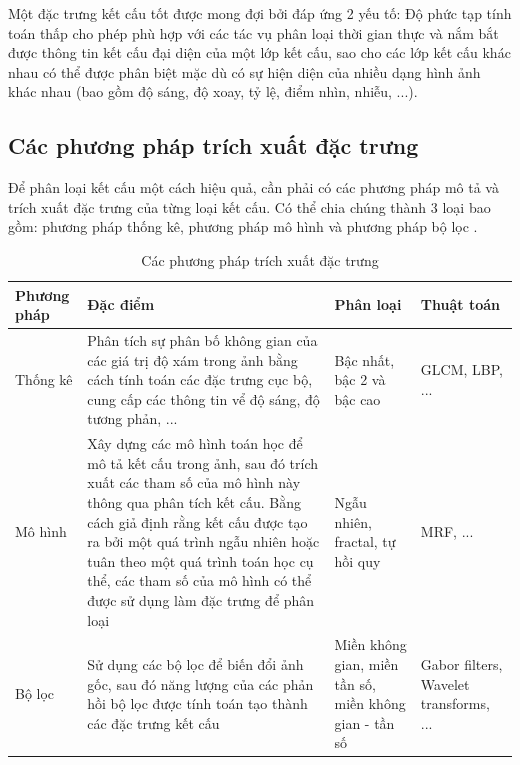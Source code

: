 Một đặc trưng kết cấu tốt được mong đợi bởi đáp ứng 2 yếu tố: Độ phức tạp tính toán thấp cho phép phù hợp với các tác vụ phân loại thời gian thực và nắm bắt được thông tin kết cấu đại diện của một lớp kết cấu, sao cho các lớp kết cấu khác nhau có thể được phân biệt mặc dù có sự hiện diện của nhiều dạng hình ảnh khác nhau (bao gồm độ sáng, độ xoay, tỷ lệ, điểm nhìn, nhiễu, ...).


\subsection{Các phương pháp trích xuất đặc trưng}
Để phân loại kết cấu một cách hiệu quả, cần phải có các phương pháp mô tả và trích xuất đặc trưng của từng loại kết cấu. Có thể chia chúng thành 3 loại bao gồm: phương pháp thống kê, phương pháp mô hình và phương pháp bộ lọc \cite{analyticOfTexture}.

\begin{table}[h]
    \centering
    \renewcommand{\arraystretch}{1.3} %
        \caption{Các phương pháp trích xuất đặc trưng}
    \begin{tabular}{p{3cm} p{7cm} p{3cm} p{2cm}}
        \toprule
        \textbf{Phương pháp} & \textbf{Đặc điểm} & \textbf{Phân loại} & \textbf{Thuật toán} \\
        \midrule
        Thống kê & Phân tích sự phân bố không gian của các giá trị độ xám trong ảnh bằng cách tính toán các đặc trưng cục bộ, cung cấp các thông tin vể độ sáng, độ tương phản, ... & Bậc nhất, bậc 2 và bậc cao& GLCM, LBP, ... \\
        \midrule
        Mô hình & Xây dựng các mô hình toán học để mô tả kết cấu trong ảnh, sau đó trích xuất các tham số của mô hình này thông qua phân tích kết cấu. Bằng cách giả định rằng kết cấu được tạo ra bởi một quá trình ngẫu nhiên hoặc tuân theo một quá trình toán học cụ thể, các tham số của mô hình có thể được sử dụng làm đặc trưng để phân loại & Ngẫu nhiên, fractal, tự hồi quy & MRF, ... \\

                \midrule
        Bộ lọc & Sử dụng các bộ lọc để biến đổi ảnh gốc, sau đó năng lượng của các phản hồi bộ lọc được tính toán tạo thành các đặc trưng kết cấu & Miền không gian, miền tần số, miền không gian - tần số & Gabor filters, Wavelet transforms, ... \\
                        \bottomrule

    \end{tabular}

    \label{tab:texture_analysis}
\end{table}

